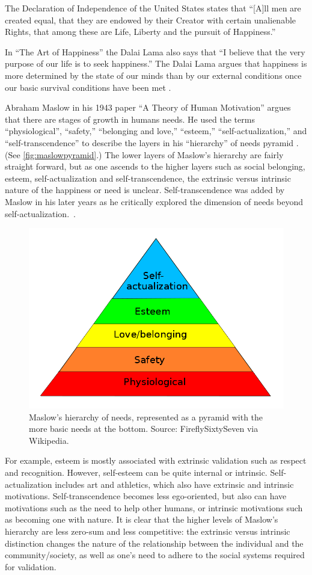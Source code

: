 The Declaration of Independence of the United States states that ``[A]ll men are created equal, that they are endowed by their Creator with certain unalienable Rights, that among these are Life, Liberty and the pursuit of Happiness.''

In ``The Art of Happiness'' the Dalai Lama also says that ``I believe that the very purpose of our life is to seek happiness.'' The Dalai Lama argues that happiness is more determined by the state of our minds than by our external conditions once our basic survival conditions have been met \cite{lama2009art}.

Abraham Maslow in his 1943 paper ``A Theory of Human Motivation'' argues that there are stages of growth in humans needs. He used the terms ``physiological'', ``safety,'' ``belonging and love,'' ``esteem,'' ``self-actualization,'' and ``self-transcendence'' to describe the layers in his ``hierarchy'' of needs pyramid \cite{maslow_theory_1943}. (See \autoref{fig:maslowpyramid}.) The lower layers of Maslow's hierarchy are fairly straight forward, but as one ascends to the higher layers such as social belonging, esteem, self-actualization and self-transcendence, the extrinsic versus intrinsic nature of the happiness or need is unclear. Self-transcendence was added by Maslow in his later years as he critically explored the dimension of needs beyond self-actualization.\ \cite{maslow1991critique}.

\begin{figure}[t]
 \centering
 \includegraphics[width=.5\textwidth]{pictures/MaslowsHierarchyOfNeeds}
 \caption[Maslow's hierarchy of needs]{Maslow's hierarchy of needs, represented as a pyramid with the more basic needs at the bottom. Source: FireflySixtySeven via Wikipedia. \ccbysa}
 \label{fig:maslowpyramid}
\end{figure}

For example, esteem is mostly associated with extrinsic validation such as respect and recognition. However, self-esteem can be quite internal or intrinsic. Self-actualization includes art and athletics, which also have extrinsic and intrinsic motivations. Self-transcendence becomes less ego-oriented, but also can have motivations such as the need to help other humans, or intrinsic motivations such as becoming one with nature. It is clear that the higher levels of Maslow's hierarchy are less zero-sum and less competitive: the extrinsic versus intrinsic distinction changes the nature of the relationship between the individual and the community/society, as well as one's need to adhere to the social systems required for validation.

